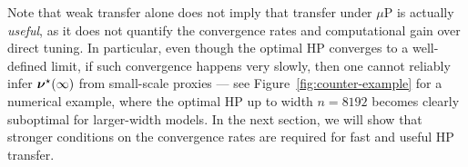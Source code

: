 Note that weak transfer alone does not imply that transfer under $\mu$P is actually \emph{useful}, as it does not quantify the convergence rates and computational gain over direct tuning. In particular, even though the optimal HP converges to a well-defined limit, if such convergence happens very slowly, then one cannot reliably infer $\bm{\nu}^\star(\infty)$ from small-scale proxies --- see Figure~\ref{fig:counter-example} for a numerical example, where the optimal HP up to width $n=8192$ becomes clearly suboptimal for larger-width models.  
In the next section, we will show that stronger conditions on the convergence rates are required for fast and useful HP transfer. 